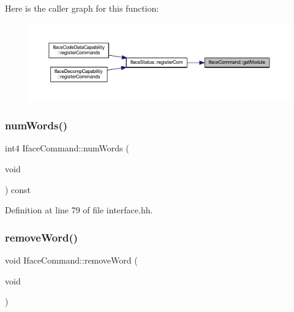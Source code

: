 Here is the caller graph for this function\+:
\nopagebreak
\begin{figure}[H]
\begin{center}
\leavevmode
\includegraphics[width=350pt]{class_iface_command_a06f9500f4b0a0e3cf14010cf133502d5_icgraph}
\end{center}
\end{figure}
\mbox{\label{class_iface_command_a7c0af3d7dffccc33423b231cce94bb40}} 
\subsubsection{\texorpdfstring{numWords()}{numWords()}}
{\footnotesize\ttfamily int4 Iface\+Command\+::num\+Words (\begin{DoxyParamCaption}\item[{void}]{ }\end{DoxyParamCaption}) const\hspace{0.3cm}{\ttfamily [inline]}}



Definition at line 79 of file interface.\+hh.

\mbox{\label{class_iface_command_a3e03d5f1a16602448b7b52021ba2e223}} 
\subsubsection{\texorpdfstring{removeWord()}{removeWord()}}
{\footnotesize\ttfamily void Iface\+Command\+::remove\+Word (\begin{DoxyParamCaption}\item[{void}]{ }\end{DoxyParamCaption})\hspace{0.3cm}{\ttfamily [inline]}}




